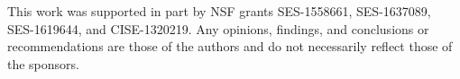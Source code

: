 \documentclass[10pt, conference, compsocconf]{IEEEtran}
\begin{document}
This work was supported in part by NSF grants SES-1558661, SES-1637089, SES-1619644, and CISE-1320219. Any opinions, findings, and conclusions or recommendations are those of the authors and do not necessarily reflect those of the sponsors.


%
%



%
%
\end{document}
